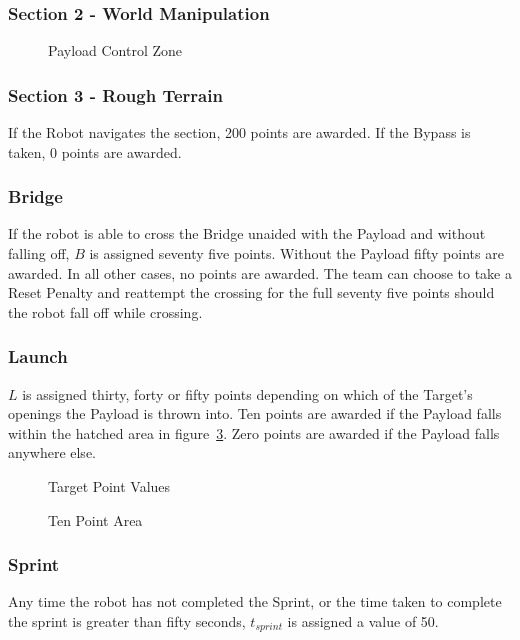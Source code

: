 \subsubsection{Section 2 - World Manipulation}

\begin{figure}[H]
	\centering
	\caption{Payload Control Zone}
	\label{fig:control_zone} 
\end{figure}

\subsubsection{Section 3 - Rough Terrain}
If the Robot navigates the section, 200 points are awarded. If the Bypass is taken, 0 points are awarded.

\subsubsection{Bridge}
If the robot is able to cross the Bridge unaided with the Payload and without falling off, $B$ is assigned seventy five points. Without the Payload fifty points are awarded. In all other cases, no points are awarded. The team can choose to take a Reset Penalty and reattempt the crossing for the full seventy five points should the robot fall off while crossing.

\subsubsection{Launch}
$L$ is assigned thirty, forty or fifty points depending on which of the Target’s openings the Payload is thrown into. Ten points are awarded if the Payload falls within the hatched area in figure~\ref{fig:10pts_zone}. Zero points are awarded if the Payload falls anywhere else.

\begin{figure}[H]
	\centering
	\caption{Target Point Values}
	\label{fig:target} 
\end{figure}

\begin{figure}[H]
	\centering
	\caption{Ten Point Area}
	\label{fig:10pts_zone} 
\end{figure}

\subsubsection{Sprint}
Any time the robot has not completed the Sprint, or the time taken to complete the sprint is greater than fifty seconds, $t_{sprint}$ is assigned a value of 50. 

